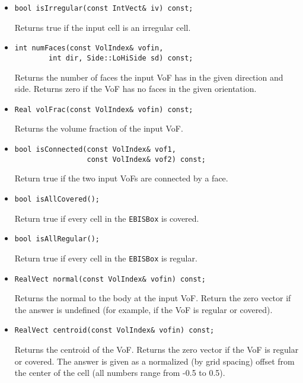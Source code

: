 \begin{itemize}
\item \begin{verbatim}
bool isIrregular(const IntVect& iv) const;
\end{verbatim}
Returns true if the input cell is an irregular cell. 

\item \begin{verbatim}
int numFaces(const VolIndex& vofin, 
        int dir, Side::LoHiSide sd) const;
\end{verbatim}
Returns the number of faces the input VoF has 
in the given direction and side.  Returns zero if
the VoF has no faces in the given orientation.

\item \begin{verbatim}
Real volFrac(const VolIndex& vofin) const;
\end{verbatim}
Returns the volume fraction of the input VoF.


\item\begin{verbatim}
bool isConnected(const VolIndex& vof1,
                 const VolIndex& vof2) const;
\end{verbatim}
Return true if the two input VoFs are connected by a face.

\item\begin{verbatim}
bool isAllCovered();
\end{verbatim}
Return true if every cell in the {\tt EBISBox} is covered.

\item\begin{verbatim}
bool isAllRegular();
\end{verbatim}
Return true if every cell in the {\tt EBISBox} is regular.

\item\begin{verbatim}
RealVect normal(const VolIndex& vofin) const;
\end{verbatim}
Returns the normal to the body at the input VoF. Return the zero
vector if the answer is undefined (for example,
if the VoF is regular or covered).

\item\begin{verbatim}
RealVect centroid(const VolIndex& vofin) const;
\end{verbatim}
Returns the centroid of the VoF.  Returns the zero vector if the VoF
is regular or covered.  The answer is given as a normalized (by grid
spacing) offset from the center of the cell (all numbers range from
-0.5 to 0.5). 


\end{itemize}
